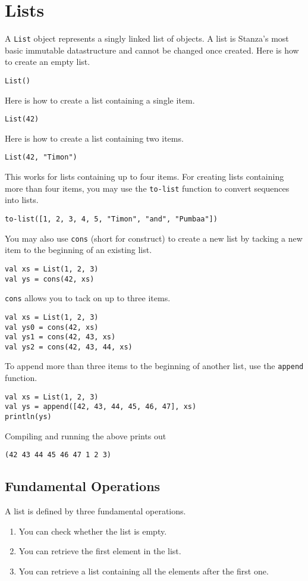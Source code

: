 \documentclass[10pt,oneside]{book}
\begin{document}
\section{Lists}
A \texttt{\frenchspacing List} object represents a singly linked list of objects. A list is Stanza's most basic immutable datastructure and cannot be changed once created. Here is how to create an empty list.
\begin{lstlisting}
List()
\end{lstlisting}
Here is how to create a list containing a single item.
\begin{lstlisting}
List(42)
\end{lstlisting}
Here is how to create a list containing two items.
\begin{lstlisting}
List(42, "Timon")
\end{lstlisting}
This works for lists containing up to four items. For creating lists containing more than four items, you may use the \texttt{\frenchspacing to-list} function to convert sequences into lists.
\begin{lstlisting}
to-list([1, 2, 3, 4, 5, "Timon", "and", "Pumbaa"])
\end{lstlisting}

You may also use \texttt{\frenchspacing cons} (short for construct) to create a new list by tacking a new item to the beginning of an existing list.
\begin{lstlisting}
val xs = List(1, 2, 3)
val ys = cons(42, xs)
\end{lstlisting}
\texttt{\frenchspacing cons} allows you to tack on up to three items.
\begin{lstlisting}
val xs = List(1, 2, 3)
val ys0 = cons(42, xs)
val ys1 = cons(42, 43, xs)
val ys2 = cons(42, 43, 44, xs)
\end{lstlisting}

To append more than three items to the beginning of another list, use the \texttt{\frenchspacing append} function.
\begin{lstlisting}
val xs = List(1, 2, 3)
val ys = append([42, 43, 44, 45, 46, 47], xs)
println(ys)
\end{lstlisting}
Compiling and running the above prints out
\begin{lstlisting}
(42 43 44 45 46 47 1 2 3)
\end{lstlisting}

\subsection*{Fundamental Operations}
A list is defined by three fundamental operations.
\begin{enumerate}
\item You can check whether the list is empty.
\item You can retrieve the first element in the list.
\item You can retrieve a list containing all the elements after the first one.
\end{enumerate}
\end{document}
